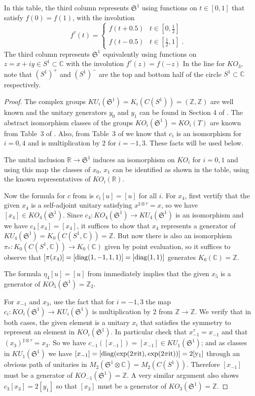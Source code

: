 \documentclass[12pt, reqno]{amsart}
\theoremstyle{definition}
\def\R{{\mathbb R}}
\def\C{{\mathbb C}}
\def\Z{{\mathbb Z}}
\def\diag{\rm{diag}}
\newcommand{\fS}{\mathfrak S}
\begin{document}
In this table, the third column represents $\fS^1$ using functions on $t \in [0,1]$ that satisfy $f(0) = f(1)$, with the involution 
$$f^\tau(t) = \begin{cases} f(t+0.5)  & t \in \left[ 0, \tfrac 12  \right]   \\ f(t-0.5)  & t \in \left[ \tfrac 12 , 1 \right] \; . \end{cases} $$
The third column represents $\fS^1$ equivalently using functions on $z = x + iy \in S^1 \subset \C$ with the involution 
$f^\tau(z)  = {f(-z)}$
In the line for $KO_3$, note that $(S^1)^+$ and $(S^1)^-$ are the top and bottom half of the circle $S^1 \subset \C$ respectively.

\begin{proof}
The complex groups $KU_i(\fS^1) = K_i(C(S^1)) = (\Z, \Z)$ are well known and the unitary generators $y_0$ and $y_1$ can be found in Section 4 of  \cite{Boer2020}. The abstract isomorphism classes of the groups $KO_i(\fS^1) = KO_i(T)$ are known from Table~3 of \cite{Boer2002}.
Also, from Table~3 of \cite{Boer2002} we know that $c_i$ is an isomorphism for $i = 0,4$ and is multiplication by 2 for $i = -1, 3$. These facts will be used below. 

The unital inclusion $\R \rightarrow \fS^1$ induces an isomorphism on $KO_i$ for $i = 0,1$ and using this map the classes of $x_0$, $x_1$ can be identified as shown in the table, using the known representatives of $KO_i(\R)$. 

Now the formula for $c$ from \cite{Boer2002} is $c_i[u] = [u]$ for all $i$. 
For $x_4$, first vertify that the given $x_4$ is a self-adjoint unitary satisfying $x^{\sharp \otimes \tau} = x$, so we have $[x_4] \in KO_4(\fS^1)$. 
Since $c_4 \colon KO_4(\fS^1) \rightarrow KU_4(\fS^1)$ is an isomorphism and we have $c_4[x_4] = [x_4]$, it suffices to show that $x_4$ represents a generator of $KU_4(\fS^1) = K_0(C(S^1, \C)) = \Z$. But now there is also an isomorphism $\pi_* \colon K_0(C(S^1, \C)) \rightarrow K_0(\C)$ given by point evaluation, so it suffices to observe that $[\pi(x_4)] = [\diag(1, -1, 1, 1)] = [\diag(1,1)]$ generates $K_0(\C) = \Z$.

The formula $\eta_4[u] = [u]$ from \cite{Boer2020} immediately implies that the given $x_5$ is a generator of $KO_5(\fS^1) = \Z_2$.

For $x_{-1}$ and $x_3$, use the fact that for $i = -1, 3$ the map  $c_{i} \colon KO_{i}(\fS^1) \rightarrow KU_{i}(\fS^1)$ is multiplication by 2 from $\Z \rightarrow \Z$. 
We verify that in both cases, the given element is a unitary $x_i$ that satisfies the symmetry to represent an element in $KO_i(\fS^1)$. In particular check that $x_{-1}^\tau = x_{-1}$ and that $(x_3)^{\sharp \otimes \tau} = x_3$. So we have
$c_{-1}([x_{-1}]) = [x_{-1}] \in KU_1(\fS^1)$; and as classes in $KU_1(\fS^1)$ we have $[x_{-1}] = [\diag(\exp(2 \pi it), \exp(2 \pi it) ) ] = 2[ y_1]$ through an obvious path of unitaries in $M_2(\fS^1 \otimes \C) = M_2(C(S^1))$. Therefore $[x_{-1}]$ must be a generator of $KO_{-1}(\fS^1) = \Z$. 
A very similar argument also shows $c_3[x_3] = 2[y_1]$ so that $[x_3]$ must be a generator of $KO_3(\fS^1) = \Z$.
\end{proof}
\end{document}
